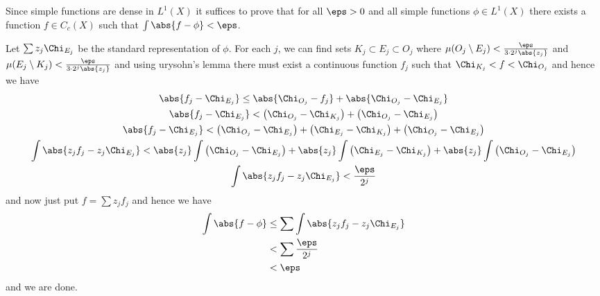 \documentclass{pset}
\begin{document}
\begin{problem}
    Since simple functions are dense in $L^1(X)$ it suffices to prove that for all $\eps>0$ and all simple functions $\phi\in L^1(X)$ there exists a function $f\in C_c(X)$ such that \(\int \abs{f-\phi}<\eps\). 
    
    Let $\sum z_j\Chi_{E_j}$ be the standard representation of $\phi$. For each $j$, we can find sets $K_j\subset E_j\subset O_j$ where $\mu(O_j\setminus E_j)<\frac{\eps}{3 \cdot 2^{j}\abs{z_j}}$ and $\mu(E_j\setminus K_j)<\frac{\eps}{3 \cdot 2^{j}\abs{z_j}}$ and using urysohn's lemma there must exist a continuous function $f_j$ such that $\Chi_{K_j}<f<\Chi_{O_j}$ and hence we have
    \begin{gather*}
        \abs{f_j-\Chi_{E_j}} \leq \abs{\Chi_{O_j}-f_j}+\abs{\Chi_{O_j}-\Chi_{E_j}} \\
        \abs{f_j-\Chi_{E_j}} <\big(\Chi_{O_j}-\Chi_{K_j}\big)+\big(\Chi_{O_j}-\Chi_{E_j}\big) \\
        \abs{f_j-\Chi_{E_j}} <\big(\Chi_{O_j}-\Chi_{E_j}\big)+\big(\Chi_{E_j}-\Chi_{K_j}\big)+\big(\Chi_{O_j}-\Chi_{E_j}\big) \\
        \int \abs{z_jf_j-z_j\Chi_{E_j}} < \abs{z_j}\int \big(\Chi_{O_j}-\Chi_{E_j}\big)+\abs{z_j}\int \big(\Chi_{E_j}-\Chi_{K_j}\big)+\abs{z_j}\int \big(\Chi_{O_j}-\Chi_{E_j}\big) \\
        \int \abs{z_jf_j-z_j\Chi_{E_j}} < \frac{\eps}{2^{j}}
    \end{gather*}
    and now just put $f=\sum z_jf_j$ and hence we have
    \begin{align*}
        \int \abs{f-\phi} &\leq \sum \int \abs{z_jf_j-z_j\Chi_{E_j}} \\
        &< \sum \frac{\eps}{2^{j}} \\
        &< \eps
    \end{align*}
    and we are done.

\end{problem}
\end{document}
